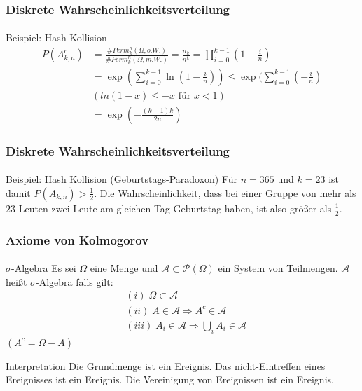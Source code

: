 \documentclass{beamer}
\begin{document}
\begin{frame}
    \frametitle{Diskrete Wahrscheinlichkeitsverteilung}
\framesubtitle{}

\begin{block}{Beispiel: Hash Kollision}
\begin{align*}
 P(A^c_{k,n} ) & = \frac{\# Perm^n_k(\Omega, o.W.)}{ \# Perm^n_k(\Omega, m.W.)} = \frac{n_k}{n^k} = \prod_{i=0}^{k-1} (1- \frac{i}{n}) \\
& = \exp (\sum_{i=0}^{k-1} \ln {(1- \frac{i}{n})}) \leq  \exp (\sum_{i=0}^{k-1} (- \frac{i}{n}) \\
 & (ln(1-x) \leq -x \text{ für } x < 1) \\
&= \exp(- \frac{(k-1)k } {2n})
\end{align*}
\end{block}



 \end{frame}

\begin{frame}
    \frametitle{Diskrete Wahrscheinlichkeitsverteilung}
\framesubtitle{}

\begin{block}{Beispiel: Hash Kollision (Geburtstags-Paradoxon)}
Für $n=365$ und $k=23$ ist damit $ P(A_{k,n} ) > \frac{1}{2}$. Die Wahrscheinlichkeit, dass bei einer Gruppe von mehr als $23$ Leuten zwei Leute am gleichen Tag Geburtstag haben, ist also größer als $ \frac{1}{2}$.
\end{block}



 \end{frame}




\begin{frame}
    \frametitle{Axiome von Kolmogorov}
\framesubtitle{}
\begin{block}{$\sigma$-Algebra}
Es sei $\Omega$ eine Menge und $\mathcal{A} \subset  \mathcal{P}(\Omega)$ ein System von Teilmengen. $\mathcal{A}$ heißt $\sigma$-Algebra falls gilt:
\begin{align*}
& (i) \; \Omega \subset \mathcal{A} \\
& (ii) \; A \in \mathcal{A} \Rightarrow A^c \in \mathcal{A} \\
& (iii) \; A_i \in \mathcal{A} \Rightarrow \bigcup_i A_i \in \mathcal{A} 
\end{align*}
$(A^c = \Omega - A)$
\end{block}

\begin{block}{Interpretation}
Die Grundmenge ist ein Ereignis. Das nicht-Eintreffen eines Ereignisses ist ein Ereignis. Die Vereinigung von Ereignissen ist ein Ereignis.
\end{block}


 \end{frame}
\end{document}
